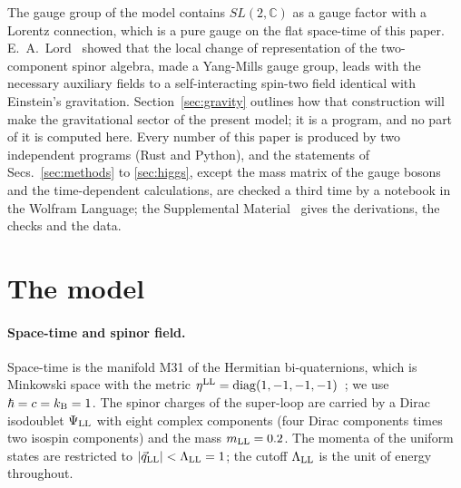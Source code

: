 \documentclass[aps,prd,twocolumn,superscriptaddress,nofootinbib,floatfix,longbibliography]{revtex4-2}
\newcommand{\LL}{{\rm LL}}
\begin{document}
The gauge group of the model contains $SL(2,\mathbb C)$ as a gauge factor with a Lorentz connection, which is a pure gauge
on the flat space-time of this paper. E.~A.~Lord~\cite{Lord1971} showed that the local change of representation of the
two-component spinor algebra, made a Yang-Mills gauge group, leads with the necessary auxiliary fields to a self-interacting
spin-two field identical with Einstein's gravitation. Section~\ref{sec:gravity} outlines how that construction will
make the gravitational sector of the present model; it is a program, and no part of it is computed here. Every number of
this paper is produced by two independent programs (Rust and Python), and the statements of Secs.~\ref{sec:methods} to
\ref{sec:higgs}, except the mass matrix of the gauge bosons and the time-dependent calculations, are checked a third time by
a notebook in the Wolfram Language; the Supplemental Material~\cite{SM} gives the derivations, the checks and the data.

\section{The model}
\label{sec:model}

\paragraph*{Space-time and spinor field.}
Space-time is the manifold M31 of the Hermitian bi-quaternions, which is Minkowski space with the metric
$\eta^\LL={\rm diag}(1,-1,-1,-1)$~\cite{Nash2026}; we use $\hbar=c=k_{\rm B}=1$. The spinor charges of the super-loop are
carried by a Dirac isodoublet $\Psi_\LL$ with eight complex components (four Dirac components times two isospin components)
and the mass $m_\LL=0.2$. The momenta of the uniform states are restricted to $|\vec q_\LL|<\Lambda_\LL=1$; the cutoff
$\Lambda_\LL$ is the unit of energy throughout.
\end{document}
